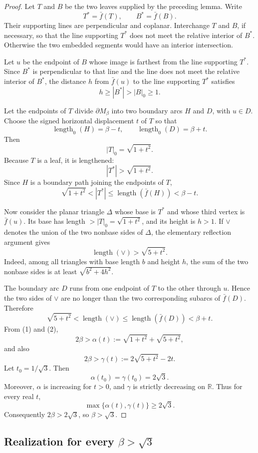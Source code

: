 \documentclass[12pt]{article}
\newcommand{\R}{\mathbb R}
\newcommand{\len}{\operatorname{length}}
\begin{document}
\begin{proof}
Let \(T\) and \(B\) be the two leaves supplied by the preceding lemma.  Write
\[
T^*=\bar f(T),\qquad B^*=\bar f(B).
\]
Their supporting lines are perpendicular and coplanar.  Interchange \(T\) and \(B\), if necessary, so that the line supporting \(T^*\) does not meet the relative interior of \(B^*\).  Otherwise the two embedded segments would have an interior intersection.

Let \(u\) be the endpoint of \(B\) whose image is farthest from the line supporting \(T^*\).  Since \(B^*\) is perpendicular to that line and the line does not meet the relative interior of \(B^*\), the distance \(h\) from \(\bar f(u)\) to the line supporting \(T^*\) satisfies
\[
h\ge |B^*|>|B|_0\ge 1.
\]

Let the endpoints of \(T\) divide \(\partial M_\beta\) into two boundary arcs \(H\) and \(D\), with \(u\in D\).  Choose the signed horizontal displacement \(t\) of \(T\) so that
\[
\len_0(H)=\beta-t,\qquad \len_0(D)=\beta+t.
\]
Then
\[
|T|_0=\sqrt{1+t^2}.
\]
Because \(T\) is a leaf, it is lengthened:
\[
|T^*|>\sqrt{1+t^2}.
\]
Since \(H\) is a boundary path joining the endpoints of \(T\),
\[
\sqrt{1+t^2}<|T^*|\le \len(\bar f(H))<\beta-t. \tag{1}
\]

Now consider the planar triangle \(\Delta\) whose base is \(T^*\) and whose third vertex is \(\bar f(u)\).  Its base has length \(>|T|_0=\sqrt{1+t^2}\), and its height is \(h>1\).  If \(\vee\) denotes the union of the two nonbase sides of \(\Delta\), the elementary reflection argument gives
\[
\len(\vee)>\sqrt{5+t^2}.
\]
Indeed, among all triangles with base length \(b\) and height \(h\), the sum of the two nonbase sides is at least \(\sqrt{b^2+4h^2}\).

The boundary arc \(D\) runs from one endpoint of \(T\) to the other through \(u\).  Hence the two sides of \(\vee\) are no longer than the two corresponding subarcs of \(\bar f(D)\).  Therefore
\[
\sqrt{5+t^2}<\len(\vee)\le \len(\bar f(D))<\beta+t. \tag{2}
\]
From (1) and (2),
\[
2\beta>\alpha(t):=\sqrt{1+t^2}+\sqrt{5+t^2},
\]
and also
\[
2\beta>\gamma(t):=2\sqrt{5+t^2}-2t.
\]
Let \(t_0=1/\sqrt3\).  Then
\[
\alpha(t_0)=\gamma(t_0)=2\sqrt3.
\]
Moreover, \(\alpha\) is increasing for \(t>0\), and \(\gamma\) is strictly decreasing on \(\R\).  Thus for every real \(t\),
\[
\max\{\alpha(t),\gamma(t)\}\ge 2\sqrt3.
\]
Consequently \(2\beta>2\sqrt3\), so \(\beta>\sqrt3\).
\end{proof}

\subsection{Realization for every \(\beta>\sqrt3\)}
\end{document}
